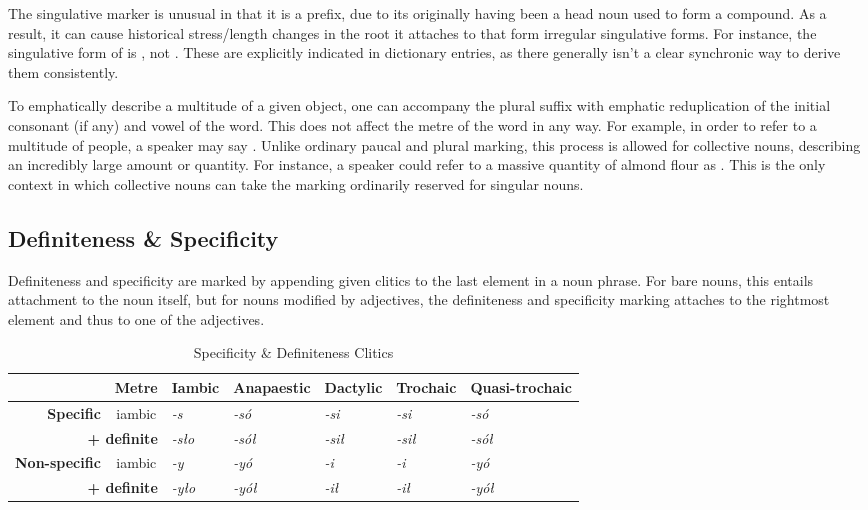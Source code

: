 \documentclass[a4paper,11pt,oneside,openany]{memoir}
\begin{document}
The singulative marker is unusual in that it is a prefix, due to its originally having been a head noun used to form a compound. As a result, it can cause historical stress/length changes in the root it attaches to that form irregular singulative forms. For instance, the singulative form of  is , not . These are explicitly indicated in dictionary entries, as there generally isn't a clear synchronic way to derive them consistently.

To emphatically describe a multitude of a given object, one can accompany the plural suffix with emphatic reduplication of the initial consonant (if any) and vowel of the word. This does not affect the metre of the word in any way. For example, in order to refer to a multitude of people, a speaker may say . Unlike ordinary paucal and plural marking, this process is allowed for collective nouns, describing an incredibly large amount or quantity. For instance, a speaker could refer to a massive quantity of almond flour as . This is the only context in which collective nouns can take the marking ordinarily reserved for singular nouns.

\subsection{Definiteness \& Specificity}

Definiteness and specificity are marked by appending given clitics to the last element in a noun phrase. For bare nouns, this entails attachment to the noun itself, but for nouns modified by adjectives, the definiteness and specificity marking attaches to the rightmost element and thus to one of the adjectives. 

\begin{table}[htb]
    \centering
    \begin{tabular}{@{}rclllll@{}}
    \toprule
    \textit{\textbf{}} & \textbf{Metre} & \multicolumn{1}{c}{\textbf{Iambic}} & \multicolumn{1}{c}{\textbf{Anapaestic}} & \multicolumn{1}{c}{\textbf{Dactylic}} & \multicolumn{1}{c}{\textbf{Trochaic}} & \multicolumn{1}{c}{\textbf{Quasi-trochaic}} \\ \midrule
    \textbf{Specific} & iambic & \textit{-s\supho{}} & \textit{-só} & \textit{-si\supho{}} & \textit{-si\supho{}} & \textit{-só} \\
    \multicolumn{2}{r}{\textbf{+ definite}} & \textit{-sło} & \textit{-sół} & \textit{-sił} & \textit{-sił} & \textit{-sół} \\
    \textbf{Non-specific} & iambic & \textit{-\suph{}y\supho{}} & \textit{-\suph{}yó} & \textit{-\suph{}i\supho{}} & \textit{-\suph{}i\supho{}} & \textit{-\suph{}yó} \\
    \multicolumn{2}{r}{\textbf{+ definite}} & \textit{-\suph{}yło} & \textit{-\suph{}yół} & \textit{-\suph{}ił} & \textit{-\suph{}ił} & \textit{-\suph{}yół} \\ \bottomrule
    \end{tabular}
    \caption{Specificity \& Definiteness Clitics}
    \label{tab:spec-def}
\end{table}
\end{document}
